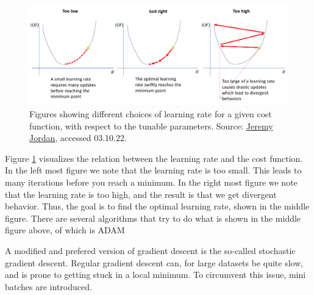 \begin{figure}[H]
    \includegraphics[width=\linewidth]{Figures/Machinelearning/lr_choice.png}
    \caption[Explaining concequence of choice of learning rate]{Figures showing different choices of learning rate for a given cost function, with respect to the tunable parameters. 
    Source: \href{https://www.jeremyjordan.me/content/images/2018/02/Screen-Shot-2018-02-24-at-11.47.09-AM.png}{Jeremy Jordan}, accessed 03.10.22.}
    \label{fig:lr_choice}
\end{figure}

Figure \ref{fig:lr_choice} visualizes the relation between the learning rate and the cost function. 
In the left most figure we note that the learning rate is too small. This leads to many iterations 
before you reach a minimum. In the right most figure we note that the learning rate is too high, 
and the result is that we get divergent behavior. Thus, the goal is to find the optimal learning 
rate, shown in the middle figure. There are several algorithms that try to do what is shown in 
the middle figure above, of which is ADAM\cite{ADAM:opti}\par 
A modified and prefered version of gradient descent is the so-called stochastic gradient descent.
Regular gradient descent can, for large datasets be quite slow, and is prone to getting stuck 
in a local minimum. To circumvent this issue, mini batches are introduced. 




